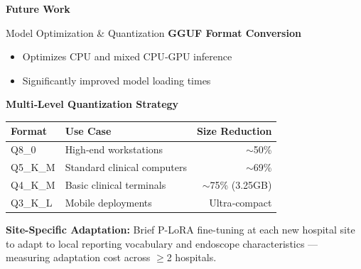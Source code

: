 ﻿\documentclass[aspectratio=169]{beamer}
\newcommand{\scite}[1]{{\footnotesize\color{darkgray}\citet{#1}}}
\begin{document}
\begin{frame}
\centering \Large \textbf{Future Work}
\end{frame}

\begin{frame}{Model Optimization \& Quantization}
\textbf{GGUF Format Conversion} \scite{dettmers2023qlora,frantar2023gptq}
\begin{itemize}
    \item Optimizes CPU and mixed CPU‑GPU inference
    \item Significantly improved model loading times \scite{frantar2023gptq}
\end{itemize}

\vspace{0.8em}
\textbf{Multi‑Level Quantization Strategy} \scite{dettmers2023qlora,frantar2023gptq}
\begin{table}
\centering
\begin{tabular}{llr}
\toprule
\textbf{Format} & \textbf{Use Case} & \textbf{Size Reduction} \\
\midrule
Q8\_0 & High‑end workstations & $\sim$50\% \\
Q5\_K\_M & Standard clinical computers & $\sim$69\% \\
Q4\_K\_M & Basic clinical terminals & $\sim$75\% (3.25GB) \scite{dettmers2023qlora} \\
Q3\_K\_L & Mobile deployments & Ultra‑compact \\
\bottomrule
\end{tabular}
\end{table}
\vspace{0.5em}
\textbf{Site-Specific Adaptation:} Brief P-LoRA fine-tuning at each new hospital site to adapt to local reporting vocabulary and endoscope characteristics --- measuring adaptation cost across $\geq$2 hospitals.
\end{frame}
\end{document}
